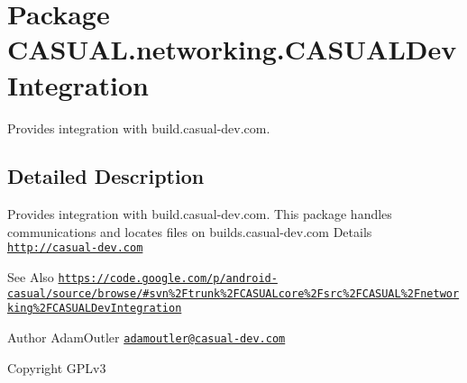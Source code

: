 \hypertarget{namespace_c_a_s_u_a_l_1_1networking_1_1_c_a_s_u_a_l_dev_integration}{\section{Package C\-A\-S\-U\-A\-L.\-networking.\-C\-A\-S\-U\-A\-L\-Dev\-Integration}
\label{namespace_c_a_s_u_a_l_1_1networking_1_1_c_a_s_u_a_l_dev_integration}
}


Provides integration with build.\-casual-\/dev.\-com.  




\subsection{Detailed Description}
Provides integration with build.\-casual-\/dev.\-com. This package handles communications and locates files on builds.\-casual-\/dev.\-com Details \href{http://casual-dev.com}{\tt http\-://casual-\/dev.\-com} \begin{DoxySeeAlso}{See Also}
\href{https://code.google.com/p/android-casual/source/browse/#svn%2Ftrunk%2FCASUALcore%2Fsrc%2FCASUAL%2Fnetworking%2FCASUALDevIntegration}{\tt https\-://code.\-google.\-com/p/android-\/casual/source/browse/\#svn\%2\-Ftrunk\%2\-F\-C\-A\-S\-U\-A\-Lcore\%2\-Fsrc\%2\-F\-C\-A\-S\-U\-A\-L\%2\-Fnetworking\%2\-F\-C\-A\-S\-U\-A\-L\-Dev\-Integration} 
\end{DoxySeeAlso}
\begin{DoxyAuthor}{Author}
Adam\-Outler \href{mailto:adamoutler@casual-dev.com}{\tt adamoutler@casual-\/dev.\-com} 
\end{DoxyAuthor}
\begin{DoxyCopyright}{Copyright}
G\-P\-Lv3 
\end{DoxyCopyright}
